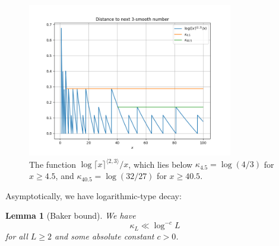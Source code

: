 \documentclass[12pt,a4paper,reqno]{amsart}
\numberwithin{equation}{section}
\theoremstyle{plain}
\newtheorem{lemma}[theorem]{Lemma}
\theoremstyle{definition}
\begin{document}
\begin{figure}
  \centering
  \includegraphics[width=0.8\textwidth]{next_smooth.png}
  \caption{The function $\log \lceil x \rceil^{\langle 2,3 \rangle}/x$, which lies below $\kappa_{4.5} = \log(4/3)$ for $x \geq 4.5$, and $\kappa_{40.5} = \log(32/27)$ for $x \geq 40.5$. 
  }\label{fig:nextsmooth}
  \end{figure}

Asymptotically, we have logarithmic-type decay:

\begin{lemma}[Baker bound]\label{baker} We have
  $$ \kappa_L \ll \log^{-c} L$$
for all $L \geq 2$ and some absolute constant $c>0$.
\end{lemma}
\end{document}

